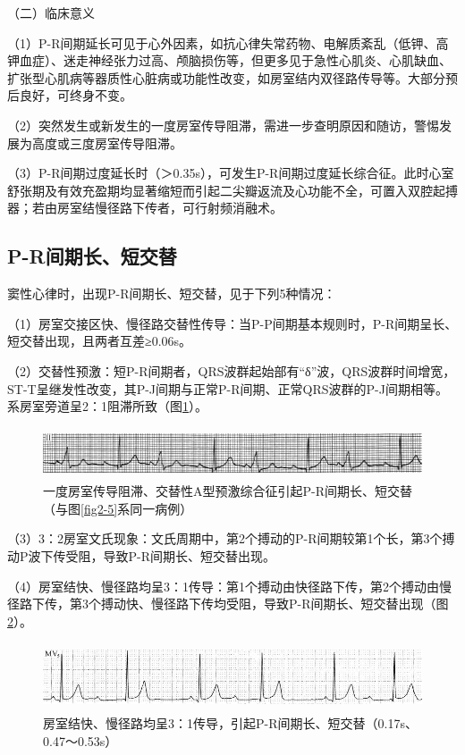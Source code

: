 （二）临床意义

（1）P-R间期延长可见于心外因素，如抗心律失常药物、电解质紊乱（低钾、高钾血症）、迷走神经张力过高、颅脑损伤等，但更多见于急性心肌炎、心肌缺血、扩张型心肌病等器质性心脏病或功能性改变，如房室结内双径路传导等。大部分预后良好，可终身不变。

（2）突然发生或新发生的一度房室传导阻滞，需进一步查明原因和随访，警惕发展为高度或三度房室传导阻滞。

（3）P-R间期过度延长时（＞0.35s），可发生P-R间期过度延长综合征。此时心室舒张期及有效充盈期均显著缩短而引起二尖瓣返流及心功能不全，可置入双腔起搏器；若由房室结慢径路下传者，可行射频消融术。

\protect\hypertarget{text00008.htmlux5cux23subid33}{}{}

\subsection{P-R间期长、短交替}

窦性心律时，出现P-R间期长、短交替，见于下列5种情况：

（1）房室交接区快、慢径路交替性传导：当P-P间期基本规则时，P-R间期呈长、短交替出现，且两者互差≥0.06s。

（2）交替性预激：短P-R间期者，QRS波群起始部有“δ”波，QRS波群时间增宽，ST-T呈继发性改变，其P-J间期与正常P-R间期、正常QRS波群的P-J间期相等。系房室旁道呈2：1阻滞所致（图\ref{fig2-12}）。

\begin{figure}[!htbp]
 \centering
 \includegraphics[width=5.78125in,height=0.59375in]{./images/Image00047.jpg}
 \captionsetup{justification=centering}
 \caption{一度房室传导阻滞、交替性A型预激综合征引起P-R间期长、短交替（与图\ref{fig2-5}系同一病例）}
 \label{fig2-12}
  \end{figure} 

（3）3：2房室文氏现象：文氏周期中，第2个搏动的P-R间期较第1个长，第3个搏动P波下传受阻，导致P-R间期长、短交替出现。

（4）房室结快、慢径路均呈3：1传导：第1个搏动由快径路下传，第2个搏动由慢径路下传，第3个搏动快、慢径路下传均受阻，导致P-R间期长、短交替出现（图\ref{fig2-13}）。

\begin{figure}[!htbp]
 \centering
 \includegraphics[width=5.58333in,height=0.79167in]{./images/Image00048.jpg}
 \captionsetup{justification=centering}
 \caption{房室结快、慢径路均呈3：1传导，引起P-R间期长、短交替（0.17s、0.47～0.53s）}
 \label{fig2-13}
  \end{figure} 

